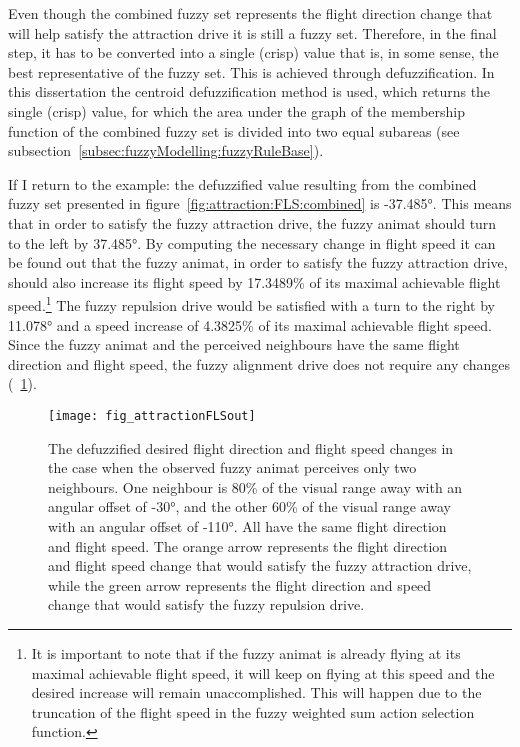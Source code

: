 Even though the combined fuzzy set represents the flight direction change that will help satisfy the attraction drive it is still a fuzzy set. Therefore, in the final step, it has to be converted into a single (crisp) value that is, in some sense, the best representative of the fuzzy set. This is achieved through defuzzification. In this dissertation the centroid defuzzification method is used, which  returns the single (crisp) value, for which the area under the graph of the membership function of the combined fuzzy set is divided into two equal subareas (see subsection~\ref{subsec:fuzzyModelling:fuzzyRuleBase}).

If I return to the example: the defuzzified value resulting from the combined fuzzy set presented in figure~\ref{fig:attraction:FLS:combined} is \ang{-37.485}. This means that in order to satisfy the fuzzy attraction drive, the fuzzy animat should turn to the left by \ang{37.485}. By computing the necessary change in flight speed it can be found out that the fuzzy animat, in order to satisfy the fuzzy attraction drive, should also increase its flight speed by 17.3489\% of its maximal achievable flight speed.\footnote{It is important to note that if the fuzzy animat is already flying at its maximal achievable flight speed, it will keep on flying at this speed and the desired increase will remain unaccomplished. This will happen due to the truncation of the flight speed in the fuzzy weighted sum action selection function.} The fuzzy repulsion drive would be satisfied with a turn to the right by \ang{11.078} and a speed increase of 4.3825\% of its maximal achievable flight speed. Since the fuzzy animat and the perceived neighbours have the same flight direction and flight speed, the fuzzy alignment drive does not require any changes (\fig~\ref{fig:attraction:FLS:output}). 

\begin{figure}
	\null\vspace*{.5\gridH}
	\texttt{[image: fig\_attractionFLSout]}
	\vspace*{.5\gridH}
	\caption{The defuzzified desired flight direction and flight speed changes in the case when the observed fuzzy animat perceives only two neighbours. One neighbour is 80\% of the visual range away with an angular offset of \ang{-30}, and the other 60\% of the visual range away with an angular offset of \ang{-110}. All have the same flight direction and flight speed. The orange arrow represents the flight direction and flight speed change that would satisfy the fuzzy attraction drive, while the green arrow represents the flight direction and speed change that would satisfy the fuzzy repulsion drive.}
	\label{fig:attraction:FLS:output}
\end{figure}
